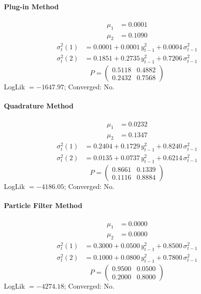 \documentclass[11pt, a4paper]{article}
\begin{document}
\paragraph{Plug-in Method}
\begin{align}
\mu_{1} &= 0.0001 \\
\mu_{2} &= 0.1090
\end{align}
\begin{align}
\sigma^2_{t}(1) &= 0.0001 + 0.0001\, y_{t-1}^2 + 0.0004\, \sigma^2_{t-1} \\
\sigma^2_{t}(2) &= 0.1851 + 0.2735\, y_{t-1}^2 + 0.7206\, \sigma^2_{t-1}
\end{align}
\begin{equation}
P = \begin{pmatrix} 0.5118 & 0.4882 \\ 0.2432 & 0.7568 \end{pmatrix}
\end{equation}
LogLik $= -1647.97$; Converged: No.

\paragraph{Quadrature Method}
\begin{align}
\mu_{1} &= 0.0232 \\
\mu_{2} &= 0.1347
\end{align}
\begin{align}
\sigma^2_{t}(1) &= 0.2404 + 0.1729\, y_{t-1}^2 + 0.8240\, \sigma^2_{t-1} \\
\sigma^2_{t}(2) &= 0.0135 + 0.0737\, y_{t-1}^2 + 0.6214\, \sigma^2_{t-1}
\end{align}
\begin{equation}
P = \begin{pmatrix} 0.8661 & 0.1339 \\ 0.1116 & 0.8884 \end{pmatrix}
\end{equation}
LogLik $= -4186.05$; Converged: No.

\paragraph{Particle Filter Method}
\begin{align}
\mu_{1} &= 0.0000 \\
\mu_{2} &= 0.0000
\end{align}
\begin{align}
\sigma^2_{t}(1) &= 0.3000 + 0.0500\, y_{t-1}^2 + 0.8500\, \sigma^2_{t-1} \\
\sigma^2_{t}(2) &= 0.1000 + 0.0800\, y_{t-1}^2 + 0.7800\, \sigma^2_{t-1}
\end{align}
\begin{equation}
P = \begin{pmatrix} 0.9500 & 0.0500 \\ 0.2000 & 0.8000 \end{pmatrix}
\end{equation}
LogLik $= -4274.18$; Converged: No.
\end{document}

